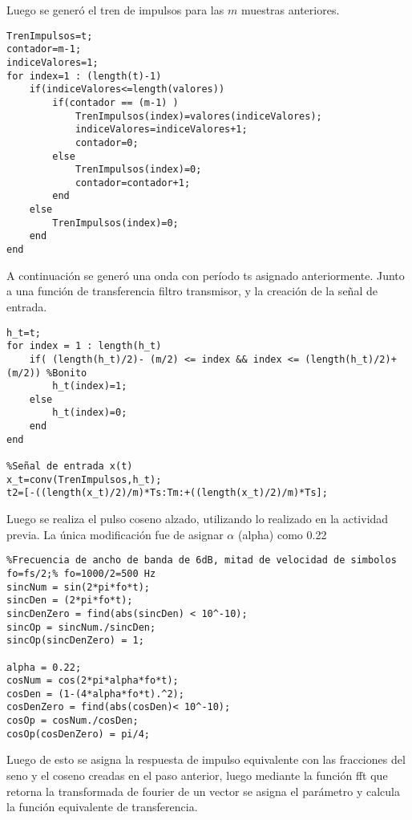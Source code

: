 Luego se generó el tren de impulsos para las $m$ muestras anteriores.
        


\begin{lstlisting}[language=mat]
%Tren de Impulsos separados en Ts => por m muestras
TrenImpulsos=t;
contador=m-1;
indiceValores=1;
for index=1 : (length(t)-1)
    if(indiceValores<=length(valores))
        if(contador == (m-1) )
            TrenImpulsos(index)=valores(indiceValores);
            indiceValores=indiceValores+1;
            contador=0;
        else
            TrenImpulsos(index)=0;
            contador=contador+1;
        end
    else 
        TrenImpulsos(index)=0;
    end
end
\end{lstlisting}


A continuación  se generó  una onda con período ts asignado anteriormente. Junto a una función de transferencia filtro transmisor, y la creación de la señal de entrada.

\begin{lstlisting}[language=mat]
%Onda cajon con periodo Ts, funcion transferencia filtro trasmisor h_t(t)
h_t=t;
for index = 1 : length(h_t) 
    if( (length(h_t)/2)- (m/2) <= index && index <= (length(h_t)/2)+(m/2)) %Bonito
        h_t(index)=1;
    else
        h_t(index)=0;
    end
end

%Señal de entrada x(t)
x_t=conv(TrenImpulsos,h_t);
t2=[-((length(x_t)/2)/m)*Ts:Tm:+((length(x_t)/2)/m)*Ts];
\end{lstlisting}


Luego se realiza el pulso coseno alzado, utilizando lo realizado en la actividad previa. La única modificación fue  de asignar $\alpha$ (alpha) como 0.22 




\begin{lstlisting}[language=mat]
%Coseno alzado
%Frecuencia de ancho de banda de 6dB, mitad de velocidad de simbolos
fo=fs/2;% fo=1000/2=500 Hz
sincNum = sin(2*pi*fo*t);
sincDen = (2*pi*fo*t);
sincDenZero = find(abs(sincDen) < 10^-10);
sincOp = sincNum./sincDen;
sincOp(sincDenZero) = 1;

alpha = 0.22;
cosNum = cos(2*pi*alpha*fo*t);
cosDen = (1-(4*alpha*fo*t).^2);
cosDenZero = find(abs(cosDen)< 10^-10);
cosOp = cosNum./cosDen;
cosOp(cosDenZero) = pi/4;
\end{lstlisting}


Luego de esto se asigna la respuesta de impulso equivalente con las fracciones del seno y el coseno creadas en  el paso anterior, luego mediante la función fft que retorna la transformada de fourier de un vector se asigna el parámetro y calcula la función equivalente de transferencia.

